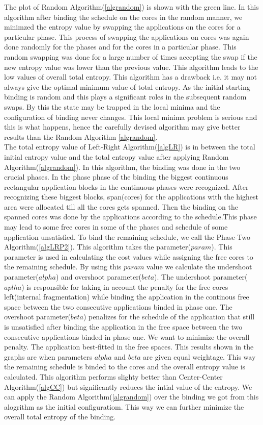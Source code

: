 \documentclass[10pt, conference]{IEEEtran}
\begin{document}
The plot of Random Algorithm(\ref{algrandom}) is shown with the green line. In this algorithm after binding the schedule on the cores in the random manner, we minimzed the entropy value by swapping the applications on the cores for a particular phase. This process of swapping the applications on cores was again done randomly for the phases and for the cores in a particular phase. This random swapping was done for a large number of times accepting the swap if the new entropy value was lower than the previous value. This algorithm leads to the low values of overall total entropy. This algorithm has a drawback i.e. it may not always give the optimal minimum value of total entropy. As the initial starting binding is random and this plays a significant roles in the subsequent random swaps. By this the state may be trapped in the local minima and the configuration of binding never changes. This local minima problem is serious and this is what happens, hence the carefully devised algorithm may give better results than the Random Algorithm \ref{algrandom}. \ \\

The total entropy value of Left-Right Algorithm(\ref{algLR}) is in between the total initial entropy value and the total entropy value after applying Random Algorithm(\ref{algrandom}). In this algorithm, the binding was done in the two crucial phases. In the phase phase of the binding the biggest continuous rectangular application blocks in the continuous phases were recognized. After recognizing these biggest blocks, span(cores) for the applications with the highest area were allocated till all the cores gets spanned. Then the binding on the spanned cores was done by the applications according to the schedule.This phase may lead to some free cores in some of the phases and schedule of some application unsatisfied. To bind the remaining schedule, we call the Phase-Two Algorithm(\ref{algLRP2}). This algorithm takes the parameter($param$). This parameter is used in calculating the cost values while assigning the free cores to the remaining schedule. By using this $param$ value we calculate the undershoot parameter($alpha$) and overshoot parameter($beta$). The undershoot parameter($aplha$) is responsible for taking in account the penalty for the free cores left(internal fragmentation) while binding the application in the continous free space between the two consecutive applications binded in phase one. The overshoot parameter($beta$) penalizes for the schedule of the application that still is unsatisfied after binding the application in the free space between the two consecutive applications binded in phase one. We want to minimize the overall penalty. The application best-fitted in the free spaces. This results shown in the graphs are when parameters $alpha$ and $beta$ are given equal weightage. This way the remaining schedule is binded to the cores and the overall entropy value is calculated. This algorithm performs slighty better than Center-Center Algorithm(\ref{algCC}) but significantly reduces the intial value of the entropy. We can apply the Random Algorithm(\ref{algrandom}) over the binding we got from this alogrithm as the initial configuratiom. This way we can further minimize the overall total entropy of the binding.\ \\
\end{document}
